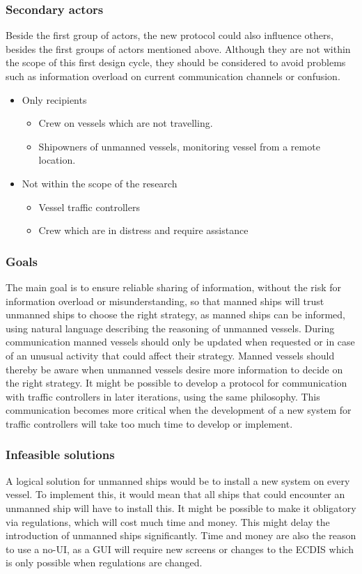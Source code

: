 \subsubsection{Secondary actors}
Beside the first group of actors, the new protocol could also influence others, besides the first groups of actors mentioned above. Although they are not within the scope of this first design cycle, they should be considered to avoid problems such as information overload on current communication channels or confusion. 
\begin{itemize}
	\item Only recipients
	\begin{itemize}
		\item Crew on vessels which are not travelling.
		\item Shipowners of unmanned vessels, monitoring vessel from a remote location.
	\end{itemize}
	\item Not within the scope of the research
	\begin{itemize}
		\item Vessel traffic controllers
		\item Crew which are in distress and require assistance
	\end{itemize}
\end{itemize}

\subsubsection{Goals}
The main goal is to ensure reliable sharing of information, without the risk for information overload or misunderstanding, so that manned ships will trust unmanned ships to choose the right strategy, as manned ships can be informed, using natural language describing the reasoning of unmanned vessels. 
During communication manned vessels should only be updated when requested or in case of an unusual activity that could affect their strategy. Manned vessels should thereby be aware when unmanned vessels desire more information to decide on the right strategy.
It might be possible to develop a protocol for communication with traffic controllers in later iterations, using the same philosophy. This communication becomes more critical when the development of a new system for traffic controllers will take too much time to develop or implement.

\subsubsection{Infeasible solutions}
A logical solution for unmanned ships would be to install a new system on every vessel. To implement this, it would mean that all ships that could encounter an unmanned ship will have to install this. It might be possible to make it obligatory via regulations, which will cost much time and money. This might delay the introduction of unmanned ships significantly.
Time and money are also the reason to use a \ac{no-UI}, as a GUI will require new screens or changes to the \ac{ECDIS} which is only possible when regulations are changed.

